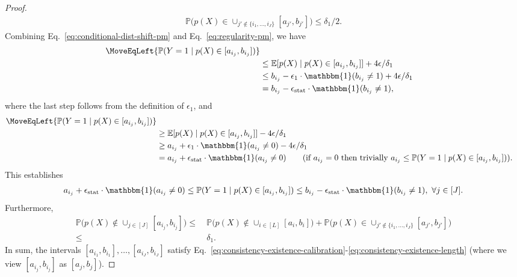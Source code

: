 \documentclass[11pt]{article}
\theoremstyle{statplain}
\theoremstyle{statdefinition}
\newcommand{\stat}{\mathrm{stat}}
\newcommand{\E}{\mathbb{E}}
\newcommand{\PP}{\mathbb{P}}
\newcommand{\0}{\mathbf{0}}
\newcommand{\estModel}{p} %
\begin{document}
\begin{proof}
\begin{align*}
    \PP\Big(\estModel(X) \in \cup_{j' \notin \{i_1,\dots,i_J\}} [a_{j'},b_{j'}]\Big) \leq \delta_1/2.
\end{align*}
Combining Eq.~\eqref{eq:conditional-dist-shift-pm} and Eq.~\eqref{eq:regularity-pm}, we have
\begin{align*}
    \MoveEqLeft{ \PP(Y = 1 \mid\estModel(X) \in [a_{i_j},b_{i_j}])} \\
    & \leq  \E[\estModel(X)\mid\estModel(X) \in [a_{i_j},b_{i_j}]] + 4\epsilon/\delta_1 \\
    & \leq  b_{i_j} - \epsilon_1 \cdot \mathbbm{1}(b_{i_j} \neq 1) + 4\epsilon/\delta_1 \\
    & =  b_{i_j} - \epsilon_\stat \cdot \mathbbm{1}(b_{i_j} \neq 1), 
\end{align*}
where the last step follows from the definition of $\epsilon_1$, and
\begin{align*}
    \MoveEqLeft{ \PP(Y = 1\mid\estModel(X) \in [a_{i_j},b_{i_j}])} \\
    & \geq  \E[\estModel(X)\mid\estModel(X) \in [a_{i_j},b_{i_j}]] - 4\epsilon/\delta_1\\
    & \geq   a_{i_j} + \epsilon_1 \cdot \mathbbm{1}(a_{i_j} \neq 0) - 4\epsilon/\delta_1\\
    & =  a_{i_j} + \epsilon_\stat \cdot \mathbbm{1}(a_{i_j} \neq 0) \tag{if $a_{i_j} = 0$ then trivially $a_{i_j} \leq \PP(Y=1\mid\estModel(X) \in [a_{i_j},b_{i_j}])$}.
\end{align*}
This establishes 
\begin{align*}
    a_{i_j} + \epsilon_\stat \cdot \mathbbm{1}(a_{i_j} \neq 0) \leq \PP(Y=1\mid\estModel(X) \in [a_{i_j},b_{i_j}]) \leq b_{i_j} - \epsilon_\stat \cdot \mathbbm{1}(b_{i_j} \neq 1),~\forall j \in [J].
\end{align*}
Furthermore,
\begin{align*}
    \PP\Big(\estModel(X) \notin \cup_{j \in [J]} [a_{i_j},b_{i_j}]\Big) \leq &~ \PP\Big(\estModel(X) \notin \cup_{i \in [L]} [a_i,b_i]\Big) + \PP\Big(\estModel(X) \in \cup_{j' \notin \{i_1,\dots,i_J\}} [a_{j'},b_{j'}]\Big) \\
    \leq &~ \delta_1.
\end{align*}
In sum, the intervals $[a_{i_1},b_{i_1}],\dots,[a_{i_J},b_{i_J}]$ satisfy Eq.~\eqref{eq:consistency-existence-calibration}-\eqref{eq:consistency-existence-length} (where we view $[a_{i_j},b_{i_j}]$ as $[a_{j},b_{j}]$).


\end{proof}
\end{document}
